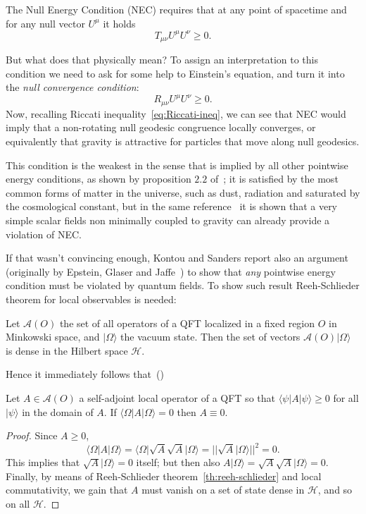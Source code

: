 \begin{definition}
    \label{def:NEC}
    The Null Energy Condition (NEC) requires that at any point of spacetime and for any null vector \(U^{\mu}\) it holds
    \[
    T_{\mu\nu}U^{\mu}U^{\nu} \ge 0.
    \]
\end{definition}

But what does that physically mean? To assign an interpretation to this condition we need to ask for some help to Einstein's equation, and turn it into the \emph{null convergence condition}:
\[
    R_{\mu\nu}U^{\mu}U^{\nu} \ge 0. 
\]
Now, recalling Riccati inequality~\eqref{eq:Riccati-ineq}, we can see that NEC would imply that a non-rotating null geodesic congruence locally converges, or equivalently that gravity is attractive for particles that move along null geodesics.

This condition is the weakest in the sense that is implied by all other pointwise energy conditions, as shown by proposition \(2.2\) of~\cite{kontou2020energy}; it is satisfied by the most common forms of matter in the universe, such as dust, radiation and saturated by the cosmological constant, but in the same reference~\cite{kontou2020energy} it is shown that a very simple scalar fields non minimally coupled to gravity can already provide a violation of NEC.

If that wasn't convincing enough, Kontou and Sanders report also an argument (originally by Epstein, Glaser and Jaffe~\cite{epstein1965nonpositivity}) to show that \emph{any} pointwise energy condition must be violated by quantum fields. To show such result Reeh-Schlieder theorem for local observables is needed:
\begin{theorem}
    \label{th:reeh-schlieder}
    Let \(\mathcal{A}(O)\) the set of all operators of a QFT localized in a fixed region \(O\) in Minkowski space, and \(\vert \Omega \rangle\) the vacuum state. Then the set of vectors \(\mathcal{A}(O)\vert \Omega \rangle\) is dense in the Hilbert space \(\mathcal{H}\).
\end{theorem}

Hence it immediately follows that~(\cite{epstein1965nonpositivity})
\begin{theorem}
    \label{th:quantum-violation-pointwise-conditions}
    Let \(A\in \mathcal{A}(O)\) a self-adjoint local operator of a QFT so that \(\langle \psi\vert A\vert\psi\rangle\ge 0\) for all \(\vert\psi\rangle\) in the domain of \(A\). If \(\langle \Omega\vert A\vert\Omega\rangle = 0\) then \(A \equiv 0\).
\end{theorem}
\begin{proof}
    Since \(A\ge 0\), 
    \[
        \langle \Omega\vert A\vert\Omega\rangle = \langle \Omega\vert \sqrt{A}\sqrt{A}\vert\Omega\rangle = \vert\vert \sqrt{A}\vert\Omega\rangle\vert\vert^2 = 0.
    \] 
    This implies that \(\sqrt{A}\vert\Omega\rangle = 0\) itself; but then also \(A\vert\Omega\rangle = \sqrt{A}\sqrt{A}\vert\Omega\rangle = 0\). Finally, by means of Reeh-Schlieder theorem~\ref{th:reeh-schlieder} and local commutativity, we gain that \(A\) must vanish on a set of state dense in \(\mathcal{H}\), and so on all \(\mathcal{H}\).
\end{proof}

